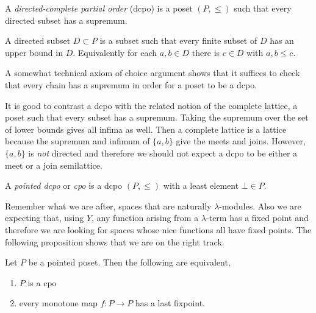 \documentclass[12pt]{article}
\begin{document}
\begin{defn}
A \textit{directed-complete partial order} (dcpo) is a poset $(P, \le)$ such that every directed subset has a supremum. 
\end{defn}

\begin{rmk}
A directed subset $D \subset P$ is a subset such that every finite subset of $D$ has an upper bound in $D$. Equivalently for each $a, b \in D$ there is $c \in D$ with $a,b \le c$. 
\end{rmk}

\begin{rmk}
A somewhat technical axiom of choice argument shows that it suffices to check that every chain has a supremum in order for a poset to be a dcpo. 
\end{rmk}

\begin{rmk}
It is good to contrast a dcpo with the related notion of the complete lattice, a poset such that every subset has a supremum. Taking the supremum over the set of lower bounds gives all infima as well. Then a complete lattice is a lattice because the supremum and infimum of $\{ a, b \}$ give the meets and joins. However, $\{ a, b \}$ is \textit{not} directed and therefore we should not expect a dcpo to be either a meet or a join semilattice.  
\end{rmk}

\begin{defn}
A \textit{pointed dcpo} or \textit{cpo} is a dcpo $(P, \le)$ with a least element $\bot \in P$.
\end{defn}

\begin{rmk}
Remember what we are after, spaces that are naturally $\lambda$-modules. Also we are expecting that, using $Y$, any function arising from a $\lambda$-term has a fixed point and therefore we are looking for spaces whose nice functions all have fixed points. The following proposition shows that we are on the right track. 
\end{rmk}

\begin{prop}
Let $P$ be a pointed poset. Then the following are equivalent,
\begin{enumerate}
\item $P$ is a cpo
\item every monotone map $f : P \to P$ has a last fixpoint.  
\end{enumerate}
\end{prop}
\end{document}

